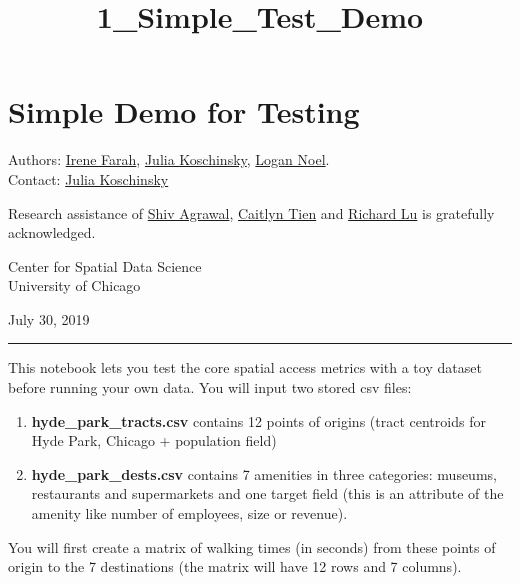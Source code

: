\documentclass[11pt]{article}
\title{1\_Simple\_Test\_Demo}
\providecommand{\tightlist}{%
      \setlength{\itemsep}{0pt}\setlength{\parskip}{0pt}}
\begin{document}
    
    
    \maketitle
    
    

    
    \hypertarget{simple-demo-for-testing}{%
\section{Simple Demo for Testing}\label{simple-demo-for-testing}}

Authors: \href{https://www.linkedin.com/in/imfarah/}{Irene Farah},
\href{https://www.linkedin.com/in/julia-koschinsky-657599b1/}{Julia
Koschinsky}, \href{https://www.linkedin.com/in/lmnoel/}{Logan Noel}.\\
Contact: \href{mailto:jkoschinsky@uchicago.edu}{Julia Koschinsky}

Research assistance of
\href{http://simonlab.uchicago.edu/people/ShivAgrawal.html}{Shiv
Agrawal},
\href{https://www.linkedin.com/in/caitlyn-tien-0b784b161/}{Caitlyn Tien}
and \href{https://www.linkedin.com/in/richard-lu-576874155/}{Richard Lu}
is gratefully acknowledged.

Center for Spatial Data Science\\
University of Chicago

July 30, 2019

    \begin{center}\rule{0.5\linewidth}{\linethickness}\end{center}

This notebook lets you test the core spatial access metrics with a toy
dataset before running your own data. You will input two stored csv
files:

\begin{enumerate}
\def\labelenumi{\arabic{enumi})}
\tightlist
\item
  \textbf{hyde\_park\_tracts.csv} contains 12 points of origins (tract
  centroids for Hyde Park, Chicago + population field)\\
\item
  \textbf{hyde\_park\_dests.csv} contains 7 amenities in three
  categories: museums, restaurants and supermarkets and one target field
  (this is an attribute of the amenity like number of employees, size or
  revenue).
\end{enumerate}

You will first create a matrix of walking times (in seconds) from these
points of origin to the 7 destinations (the matrix will have 12 rows and
7 columns).
\end{document}

